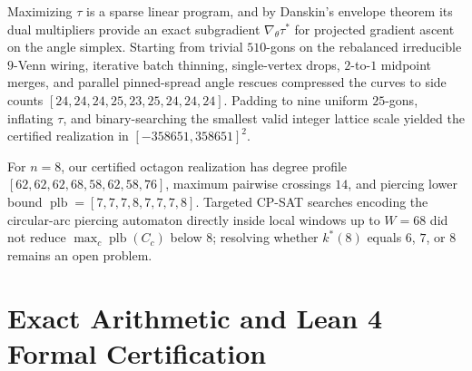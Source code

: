 \documentclass[11pt]{article}
\begin{document}
Maximizing $\tau$ is a sparse linear program, and by Danskin's envelope theorem its dual multipliers provide an exact subgradient $\nabla_\theta \tau^*$ for projected gradient ascent on the angle simplex. Starting from trivial $510$-gons on the rebalanced irreducible $9$-Venn wiring, iterative batch thinning, single-vertex drops, $2$-to-$1$ midpoint merges, and parallel pinned-spread angle rescues compressed the curves to side counts $[24, 24, 24, 25, 23, 25, 24, 24, 24]$. Padding to nine uniform $25$-gons, inflating $\tau$, and binary-searching the smallest valid integer lattice scale yielded the certified realization in $[-358651, 358651]^2$.

For $n=8$, our certified octagon realization has degree profile $[62, 62, 62, 68, 58, 62, 58, 76]$, maximum pairwise crossings $14$, and piercing lower bound $\operatorname{plb} = [7, 7, 7, 8, 7, 7, 7, 8]$. Targeted CP-SAT searches encoding the circular-arc piercing automaton directly inside local windows up to $W=68$ did not reduce $\max_c \operatorname{plb}(C_c)$ below $8$; resolving whether $k^*(8)$ equals $6$, $7$, or $8$ remains an open problem.

\section{Exact Arithmetic and Lean 4 Formal Certification}
\end{document}
